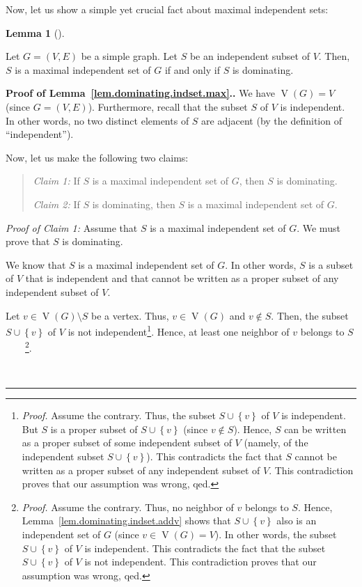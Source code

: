 \documentclass[numbers=enddot,12pt,final,onecolumn,notitlepage]{scrartcl}%
\theoremstyle{definition}
\newtheorem{lem}[theo]{Lemma}
\newenvironment{lemma}[1][]
{\begin{lem}[#1]\begin{leftbar}}
{\end{leftbar}\end{lem}}
\newenvironment{statement}{\begin{quote}}{\end{quote}}
\newenvironment{proof}[1][Proof]{\noindent\textbf{#1.} }{\ \rule{0.5em}{0.5em}}
\newcommand{\set}[1]{\left\{ #1 \right\}}
\newcommand{\tup}[1]{\left( #1 \right)}
\newcommand{\verts}[1]{\operatorname{V}\left( #1 \right)}
\begin{document}
Now, let us show a simple yet crucial fact about maximal independent
sets:

\begin{lemma} \label{lem.dominating.indset.max}
Let $G = \tup{V, E}$ be a simple graph. Let $S$ be an independent
subset of $V$. Then, $S$ is a maximal independent set of $G$ if and
only if $S$ is dominating.
\end{lemma}

\begin{proof}[Proof of Lemma~\ref{lem.dominating.indset.max}.]
We have $\verts{G} = V$ (since $G = \tup{V, E}$). Furthermore, recall
that the subset $S$ of $V$ is independent. In other words, no two
distinct elements of $S$ are adjacent (by the definition of
``independent'').

Now, let us make the following two claims:

\begin{statement}
\textit{Claim 1:} If $S$ is a maximal independent set of $G$, then
$S$ is dominating.

\textit{Claim 2:} If $S$ is dominating, then $S$ is a maximal
independent set of $G$.
\end{statement}

\textit{Proof of Claim 1:} Assume that $S$ is a maximal independent
set of $G$. We must prove that $S$ is dominating.

We know that $S$ is a maximal independent set of $G$. In other words,
$S$ is a subset of $V$ that is independent and that cannot be written
as a proper subset of any independent subset of $V$.

Let $v \in \verts{G} \setminus S$ be a vertex. Thus, $v \in \verts{G}$
and $v \notin S$. Then, the subset $S \cup \set{v}$ of $V$ is not
independent\footnote{\textit{Proof.} Assume the contrary. Thus, the
subset $S \cup \set{v}$ of $V$ is independent. But $S$ is a proper
subset of $S \cup \set{v}$ (since $v \notin S$). Hence, $S$ can be
written as a proper subset of some independent subset of $V$
(namely, of the independent subset $S \cup \set{v}$). This contradicts
the fact that $S$ cannot be written as a proper subset of any
independent subset of $V$. This contradiction proves that our
assumption was wrong, qed.}. Hence, at least one neighbor of $v$
belongs to $S$\ \ \ \ \footnote{\textit{Proof.} Assume the contrary.
Thus, no neighbor of $v$ belongs to $S$. Hence,
Lemma~\ref{lem.dominating.indset.addv} shows that $S \cup \set{v}$
also is an independent set of $G$ (since $v \in \verts{G} = V$). In
other words, the subset $S \cup \set{v}$ of $V$ is independent.
This contradicts the fact that the subset $S \cup \set{v}$ of $V$ is
not independent. This contradiction proves that our assumption was
wrong, qed.}.


\end{proof}
\end{document}
